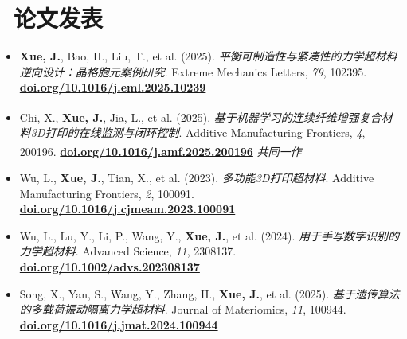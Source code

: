 \documentclass{resume}
\newcommand{\faresearch}{\faFlask}
\begin{document}
\section{\faresearch\  论文发表}
\begin{itemize}
  \item \textbf{\textbf{Xue, J.}}, Bao, H., Liu, T., et al. (2025). \textit{ 平衡可制造性与紧凑性的力学超材料逆向设计：晶格胞元案例研究}. Extreme Mechanics Letters, \textit{79}, 102395. 
  \href{https://doi.org/10.1016/j.eml.2025.10239}{\textbf{doi.org/10.1016/j.eml.2025.10239}}
  
  \item Chi, X.\textsuperscript{\dag}, \textbf{\textbf{Xue, J.}}\textsuperscript{\dag}, Jia, L., et al. (2025). \textit{基于机器学习的连续纤维增强复合材料3D打印的在线监测与闭环控制}. Additive Manufacturing Frontiers, \textit{4}, 200196. 
  \href{https://doi.org/10.1016/j.amf.2025.200196}{\textbf{doi.org/10.1016/j.amf.2025.200196}} \textsuperscript{\dag}\textit{共同一作}
  
  \item Wu, L., \textbf{\textbf{Xue, J.}}, Tian, X., et al. (2023). \textit{多功能3D打印超材料}. Additive Manufacturing Frontiers, \textit{2}, 100091. 
  \href{https://doi.org/10.1016/j.cjmeam.2023.100091}{\textbf{doi.org/10.1016/j.cjmeam.2023.100091}}
  
  \item Wu, L., Lu, Y., Li, P., Wang, Y., \textbf{\textbf{Xue, J.}}, et al. (2024). \textit{用于手写数字识别的力学超材料}. Advanced Science, \textit{11}, 2308137. 
  \href{https://doi.org/10.1002/advs.202308137}{\textbf{doi.org/10.1002/advs.202308137}}
  
  \item Song, X., Yan, S., Wang, Y., Zhang, H., \textbf{\textbf{Xue, J.}}, et al. (2025). \textit{基于遗传算法的多载荷振动隔离力学超材料}. Journal of Materiomics, \textit{11}, 100944. 
  \href{https://doi.org/10.1016/j.jmat.2024.100944}{\textbf{doi.org/10.1016/j.jmat.2024.100944}}

\end{itemize}

\end{document}
